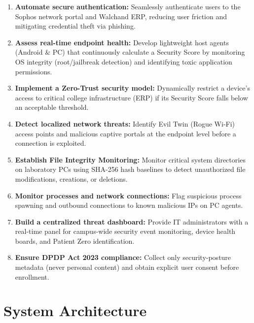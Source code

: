 \documentclass[12pt,a4paper]{report}
\begin{document}
\begin{enumerate}[leftmargin=*, noitemsep]
  \item \textbf{Automate secure authentication:} Seamlessly authenticate users to the Sophos network portal and Walchand ERP, reducing user friction and mitigating credential theft via phishing.

  \item \textbf{Assess real-time endpoint health:} Develop lightweight host agents (Android \& PC) that continuously calculate a Security Score by monitoring OS integrity (root/jailbreak detection) and identifying toxic application permissions.

  \item \textbf{Implement a Zero-Trust security model:} Dynamically restrict a device's access to critical college infrastructure (ERP) if its Security Score falls below an acceptable threshold.

  \item \textbf{Detect localized network threats:} Identify Evil Twin (Rogue Wi-Fi) access points and malicious captive portals at the endpoint level before a connection is exploited.

  \item \textbf{Establish File Integrity Monitoring:} Monitor critical system directories on laboratory PCs using SHA-256 hash baselines to detect unauthorized file modifications, creations, or deletions.

  \item \textbf{Monitor processes and network connections:} Flag suspicious process spawning and outbound connections to known malicious IPs on PC agents.

  \item \textbf{Build a centralized threat dashboard:} Provide IT administrators with a real-time panel for campus-wide security event monitoring, device health boards, and Patient Zero identification.

  \item \textbf{Ensure DPDP Act 2023 compliance:} Collect only security-posture metadata (never personal content) and obtain explicit user consent before enrollment.
\end{enumerate}

\chapter{System Architecture}
\end{document}
